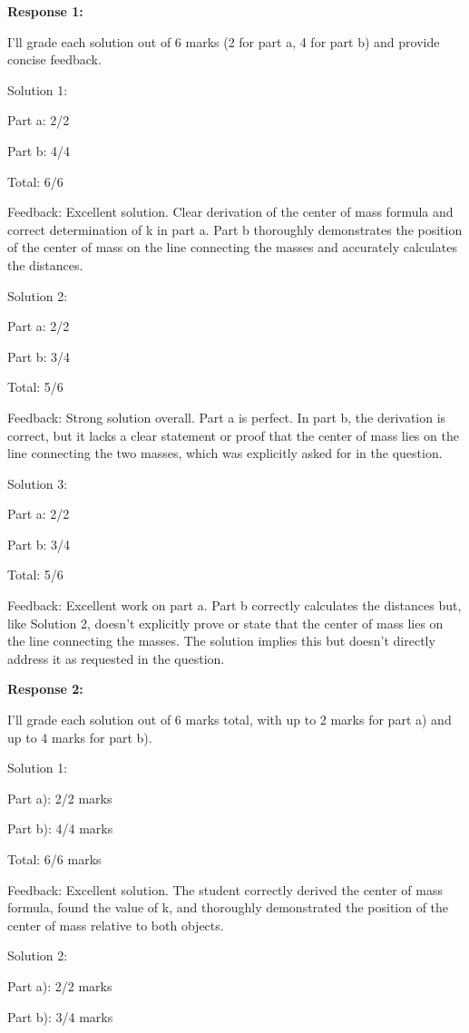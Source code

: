 \documentclass[a4paper,11pt]{article}
\begin{document}
\textbf{Response 1:}

I'll grade each solution out of 6 marks (2 for part a, 4 for part b) and provide concise feedback.

Solution 1:

Part a: 2/2

Part b: 4/4

Total: 6/6

Feedback: Excellent solution. Clear derivation of the center of mass formula and correct determination of k in part a. Part b thoroughly demonstrates the position of the center of mass on the line connecting the masses and accurately calculates the distances.

Solution 2:

Part a: 2/2

Part b: 3/4

Total: 5/6

Feedback: Strong solution overall. Part a is perfect. In part b, the derivation is correct, but it lacks a clear statement or proof that the center of mass lies on the line connecting the two masses, which was explicitly asked for in the question.

Solution 3:

Part a: 2/2

Part b: 3/4

Total: 5/6

Feedback: Excellent work on part a. Part b correctly calculates the distances but, like Solution 2, doesn't explicitly prove or state that the center of mass lies on the line connecting the masses. The solution implies this but doesn't directly address it as requested in the question.

\bigskip    
\textbf{Response 2:}

I'll grade each solution out of 6 marks total, with up to 2 marks for part a) and up to 4 marks for part b).

Solution 1:

Part a): 2/2 marks

Part b): 4/4 marks

Total: 6/6 marks

Feedback: Excellent solution. The student correctly derived the center of mass formula, found the value of k, and thoroughly demonstrated the position of the center of mass relative to both objects.

Solution 2:

Part a): 2/2 marks

Part b): 3/4 marks
\end{document}
